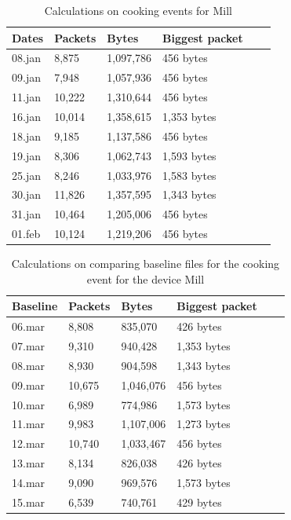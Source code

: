 \begin{table}[H]
    \centering
    \caption{Calculations on cooking events for Mill}
    \begin{tabular}{|l|l|l|l|l|l|}
    \hline
        \textbf{Dates} & \textbf{Packets} & \textbf{Bytes} & \textbf{Biggest packet} \\ \hline
        08.jan & 8,875  & 1,097,786 & 456 bytes   \\ \hline
        09.jan & 7,948  & 1,057,936 & 456 bytes   \\ \hline
        11.jan & 10,222 & 1,310,644 & 456 bytes   \\ \hline
        16.jan & 10,014 & 1,358,615 & 1,353 bytes \\ \hline
        18.jan & 9,185  & 1,137,586 & 456 bytes   \\ \hline
        19.jan & 8,306  & 1,062,743 & 1,593 bytes \\ \hline
        25.jan & 8,246  & 1,033,976 & 1,583 bytes \\ \hline
        30.jan & 11,826 & 1,357,595 & 1,343 bytes  \\ \hline
        31.jan & 10,464 & 1,205,006 & 456 bytes \\ \hline
        01.feb & 10,124 & 1,219,206 & 456 bytes \\ \hline
    \end{tabular}
    \label{tab:MillCookingCalculations}
\end{table}

\begin{table}[H]
    \centering
    \caption{Calculations on comparing baseline files for the cooking event for the
device Mill}
    \begin{tabular}{|l|l|l|l|l|l|}
    \hline
        \textbf{Baseline} & \textbf{Packets} & \textbf{Bytes} & \textbf{Biggest packet} \\ \hline
        06.mar & 8,808  & 835,070   & 426 bytes \\ \hline
        07.mar & 9,310  & 940,428   & 1,353 bytes \\ \hline
        08.mar & 8,930  & 904,598   & 1,343 bytes \\ \hline
        09.mar & 10,675 & 1,046,076 & 456 bytes \\ \hline
        10.mar & 6,989  & 774,986   & 1,573 bytes \\ \hline
        11.mar & 9,983  & 1,107,006 & 1,273 bytes \\ \hline
        12.mar & 10,740 & 1,033,467 & 456 bytes \\ \hline
        13.mar & 8,134  & 826,038   & 426 bytes \\ \hline
        14.mar & 9,090  & 969,576   & 1,573 bytes \\ \hline
        15.mar & 6,539  & 740,761   & 429 bytes \\ \hline
    \end{tabular}
    \label{tab:MillBaselineCookingCalculations}
\end{table}

